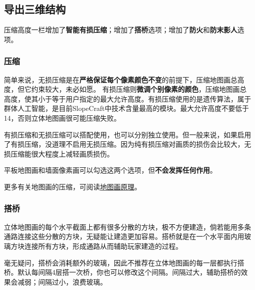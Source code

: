 \documentclass[UTF8]{ctexart}
\begin{document}
    \subsection{导出三维结构}
    压缩高度一栏增加了\textbf{智能有损压缩}；增加了\textbf{搭桥}选项；增加了\textbf{防火}和\textbf{防末影人}选项。

    \subsubsection{压缩}
    简单来说，无损压缩是在\textbf{严格保证每个像素颜色不变}的前提下，压缩地图画总高度，但它约束较大，未必如愿。
    有损压缩则\textbf{微调个别像素的颜色}，压缩地图画总高度，使其小于等于用户指定的最大允许高度。有损压缩使用的是遗传算法，属于群体人工智能，是目前SlopeCraft中技术含量最高的模块。最大允许高度不要低于14，否则立体地图画很可能压缩失败。

    有损压缩和无损压缩可以搭配使用，也可以分别独立使用。但一般来说，如果启用了有损压缩，没道理不启用无损压缩。因为纯有损压缩对画质的损伤会比较大，无损压缩能很大程度上减轻画质损伤。
    
    平板地图画和墙面像素画可以勾选这两个选项，但\textbf{不会发挥任何作用}。

    更多有关地图画的压缩，可阅读\href{https://github.com/ToKiNoBug/SlopeCraftTutorial/blob/main/BasicPrinciple/Principle%20of%20map%20pixel%20arts.md}{地图画原理}。

    \subsubsection{搭桥}
    立体地图画的每个水平截面上都有很多分散的方块，极不方便建造，倘若能用多条通路连接这些分散的方块，无疑能让建造更加容易。搭桥就是在一个水平面内用玻璃方块连接所有方块，形成通路从而辅助玩家建造的过程。
    
    毫无疑问，搭桥会消耗额外的玻璃，因此不推荐在立体地图画的每一层都执行搭桥。默认每间隔4层搭一次桥，你也可以修改这个间隔。间隔过大，辅助搭桥的效果会减弱；间隔过小，浪费玻璃。
\end{document}
